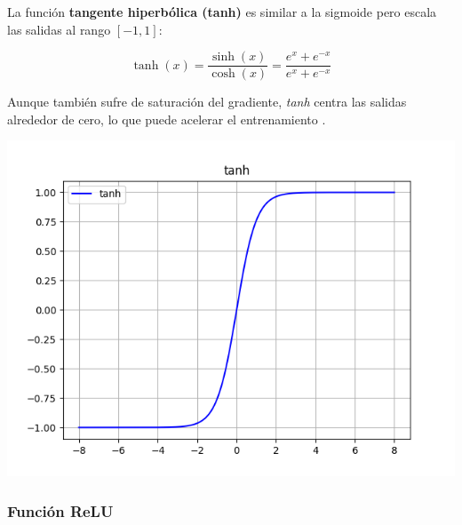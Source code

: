 \begin{minipage}{0.6\textwidth}
    La función \textbf{tangente hiperbólica (tanh)} es similar a la sigmoide pero escala las salidas al rango \([-1, 1]\):

\begin{equation}
    \tanh(x) = \frac{\sinh(x)}{\cosh(x)} = \frac{e^x + e^{-x}}{e^x + e^{-x}}
\end{equation}

Aunque también sufre de saturación del gradiente, \textit{tanh} centra las salidas alrededor de cero, lo que puede acelerar el entrenamiento \citep{pajares2021aprendizaje}. 
\end{minipage}
\begin{minipage}{0.05\textwidth}
\textbf{ }
\end{minipage}
\begin{minipage}{0.35\textwidth}
    \includegraphics[width=1.1\textwidth]{img/tanh.png}
    \label{img: tanh}
\end{minipage}



\subsubsection*{Función ReLU}

